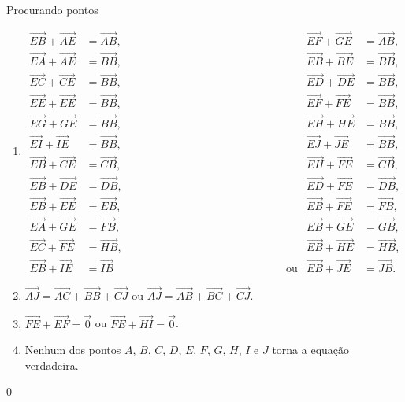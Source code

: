 \begin{answer}{Procurando pontos}
{\begin{enumerate}
\item {} 
\begin{align*}
\overrightarrow{EB} + \overrightarrow{AE} &= \overrightarrow{AB}, & 
\overrightarrow{EF} + \overrightarrow{GE} &= \overrightarrow{AB}, \\
\overrightarrow{EA} + \overrightarrow{AE} &= \overrightarrow{BB}, &
\overrightarrow{EB} + \overrightarrow{BE} &= \overrightarrow{BB}, \\
\overrightarrow{EC} + \overrightarrow{CE} &= \overrightarrow{BB}, &
\overrightarrow{ED} + \overrightarrow{DE} &= \overrightarrow{BB}, \\
\overrightarrow{EE} + \overrightarrow{EE} &= \overrightarrow{BB}, &
\overrightarrow{EF} + \overrightarrow{FE} &= \overrightarrow{BB}, \\
\overrightarrow{EG} + \overrightarrow{GE} &= \overrightarrow{BB}, &
\overrightarrow{EH} + \overrightarrow{HE} &= \overrightarrow{BB}, \\
\overrightarrow{EI} + \overrightarrow{IE} &= \overrightarrow{BB}, &
\overrightarrow{EJ} + \overrightarrow{JE} &= \overrightarrow{BB}, \\
\overrightarrow{EB} + \overrightarrow{CE} &= \overrightarrow{CB}, &
\overrightarrow{EH} + \overrightarrow{FE} &= \overrightarrow{CB}, \\
\overrightarrow{EB} + \overrightarrow{DE} &= \overrightarrow{DB}, &
\overrightarrow{ED} + \overrightarrow{FE} &= \overrightarrow{DB}, \\
\overrightarrow{EB} + \overrightarrow{EE} &= \overrightarrow{EB}, &
\overrightarrow{EB} + \overrightarrow{FE} &= \overrightarrow{FB}, \\
\overrightarrow{EA} + \overrightarrow{GE} &= \overrightarrow{FB}, &
\overrightarrow{EB} + \overrightarrow{GE} &= \overrightarrow{GB}, \\
\overrightarrow{EC} + \overrightarrow{FE} &= \overrightarrow{HB}, &
\overrightarrow{EB} + \overrightarrow{HE} &= \overrightarrow{HB}, \\
\overrightarrow{EB} + \overrightarrow{IE} &= \overrightarrow{IB}\text{ { }{ }{ }{ }{ }{ }{ }{ }{ }{ }{ }{ }{ }{ }{ }{ }{ }{ }{ }{ }{ }{ }{ ou}} & 
\overrightarrow{EB} + \overrightarrow{JE} &= \overrightarrow{JB}.
\end{align*}

\item {} 
\(\overrightarrow{AJ} = \overrightarrow{AC} + \overrightarrow{BB} + \overrightarrow{CJ}\) ou \(\overrightarrow{AJ} = \overrightarrow{AB} + \overrightarrow{BC} + \overrightarrow{CJ}\).

\item {} 
\(\overrightarrow{FE} + \overrightarrow{EF} = \vec{0}\) ou \(\overrightarrow{FE} + \overrightarrow{HI} = \vec{0}\).

\item {} 
Nenhum dos pontos \(A\), \(B\), \(C\), \(D\), \(E\), \(F\), \(G\), \(H\), \(I\) e \(J\) torna a equação verdadeira.

\end{enumerate}
}{0}
\end{answer}

